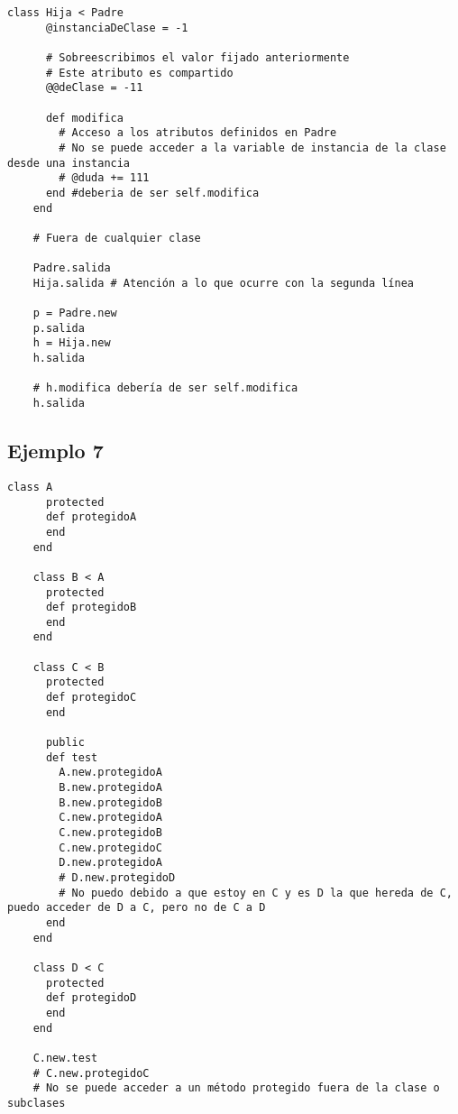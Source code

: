\documentclass[a4paper,12pt]{article}
\begin{document}
\begin{lstlisting}[style=customruby]
    class Hija < Padre
      @instanciaDeClase = -1
    
      # Sobreescribimos el valor fijado anteriormente
      # Este atributo es compartido
      @@deClase = -11
    
      def modifica
        # Acceso a los atributos definidos en Padre
        # No se puede acceder a la variable de instancia de la clase desde una instancia
        # @duda += 111
      end #deberia de ser self.modifica
    end
    
    # Fuera de cualquier clase
    
    Padre.salida
    Hija.salida # Atención a lo que ocurre con la segunda línea
    
    p = Padre.new
    p.salida
    h = Hija.new
    h.salida
    
    # h.modifica debería de ser self.modifica
    h.salida
\end{lstlisting}

\subsection{Ejemplo 7}

\begin{lstlisting}[style=customruby]
    class A
      protected
      def protegidoA
      end
    end
    
    class B < A
      protected
      def protegidoB
      end
    end
    
    class C < B
      protected
      def protegidoC
      end
    
      public
      def test
        A.new.protegidoA
        B.new.protegidoA
        B.new.protegidoB
        C.new.protegidoA
        C.new.protegidoB
        C.new.protegidoC
        D.new.protegidoA
        # D.new.protegidoD
        # No puedo debido a que estoy en C y es D la que hereda de C, puedo acceder de D a C, pero no de C a D
      end
    end
    
    class D < C
      protected
      def protegidoD
      end
    end
    
    C.new.test
    # C.new.protegidoC
    # No se puede acceder a un método protegido fuera de la clase o subclases
\end{lstlisting}
\end{document}
